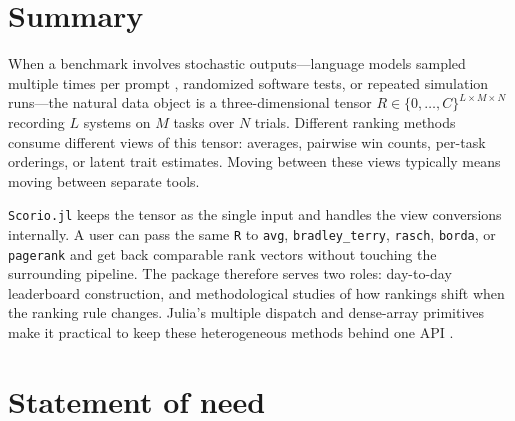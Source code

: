 \documentclass{juliacon}
\newcommand{\scorio}{\texttt{Scorio.jl}}
\begin{document}

\maketitle

\begin{abstract}
    \href{https://github.com/mohsenhariri/scorio}{\scorio{}} is a Julia package for evaluating and ranking systems from repeated responses to shared tasks. It provides a common tensor-based interface for direct score-based, pairwise, psychometric, voting, graph, and listwise methods, so the same benchmark can
    be analyzed under multiple ranking assumptions. We describe the package design, position it relative to existing Julia tools, and report pilot experiments on synthetic rank recovery, stability under limited trials, and runtime scaling.
\end{abstract}

\section{Summary}

When a benchmark involves stochastic outputs---language models sampled multiple times per prompt \cite{snell2025testtime,hariri2026ranking}, randomized software tests, or repeated simulation runs---the natural data object is a three-dimensional tensor \(R \in \{0,\ldots,C\}^{L\times M\times N}\) recording \(L\) systems on \(M\) tasks over \(N\) trials. Different ranking methods consume different views of this tensor: averages, pairwise win counts, per-task orderings, or latent trait estimates. Moving between these views typically means moving between separate tools.

\scorio{} keeps the tensor as the single input and handles the view conversions internally. A user can pass the same \texttt{R} to \texttt{avg}, \texttt{bradley\_terry}, \texttt{rasch}, \texttt{borda}, or \texttt{pagerank} and get back comparable rank vectors without touching the surrounding pipeline. The package therefore serves two roles: day-to-day leaderboard construction, and methodological studies of how rankings shift when the ranking rule changes. Julia's multiple dispatch and dense-array primitives make it practical to keep these heterogeneous methods behind one API \cite{bezanson2017julia}.

\section{Statement of need}
\end{document}
